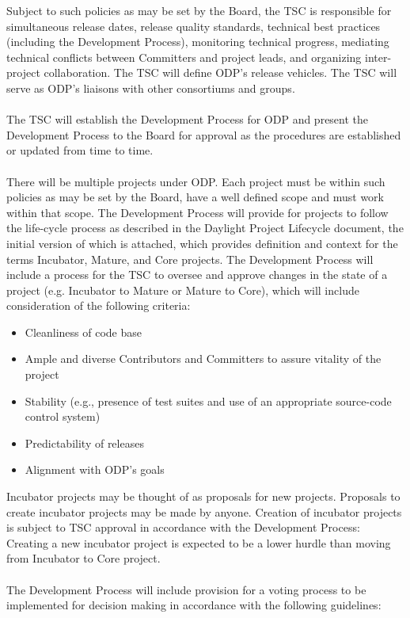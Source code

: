 \documentclass[a4paper, 12pt]{book}
\begin{document}
Subject to such policies as may be set by the Board, the TSC is responsible for simultaneous release dates, release quality standards,  technical best practices (including the Development Process), monitoring technical progress, mediating technical conflicts between Committers and project leads, and organizing inter-project collaboration. The TSC will define ODP’s release vehicles.  The TSC will serve as ODP’s liaisons with other consortiums and groups.\\
\\
The TSC will establish the Development Process for ODP and present the Development Process to the Board for approval as the procedures are established or updated from time to time.\\
\\
There will be multiple projects under ODP.  Each project must be within such policies as may be set by the Board, have a well defined scope and must work within that scope.  The Development Process will provide for projects to follow the life-cycle process as described in the Daylight Project Lifecycle document, the initial version of which is attached, which provides definition and context for the terms Incubator, Mature, and Core projects.  The Development Process will include a process for the TSC to oversee and approve changes in the state of a project (e.g. Incubator to Mature or Mature to Core), which will include consideration of the following criteria:
\begin{itemize}\itemsep0pt
\item{Cleanliness of code base}
\item{Ample and diverse Contributors and Committers to assure vitality of the project}
\item{Stability (e.g., presence of test suites and use of an appropriate source-code control system)}
\item{Predictability of releases}
\item{Alignment with ODP’s goals}
\end{itemize}
Incubator projects may be thought of as proposals for new projects.  Proposals to create incubator projects may be made by anyone. Creation of incubator projects is subject to TSC approval in accordance with the Development Process: Creating a new incubator project is expected to be a lower hurdle than moving from Incubator to Core project.\\
\\
The Development Process will include provision for a voting process to be implemented for decision making in accordance with the following guidelines:
\end{document}
